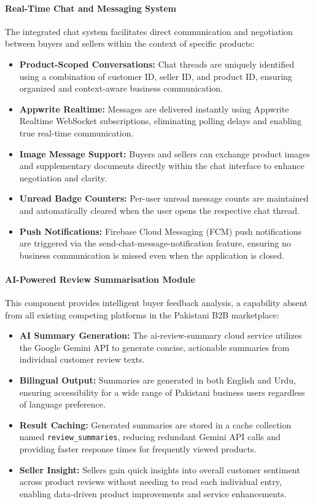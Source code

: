 \paragraph{Real-Time Chat and Messaging System}
The integrated chat system facilitates direct communication and negotiation between buyers and sellers within the context of specific products:
\begin{itemize}
    \item \textbf{Product-Scoped Conversations:} Chat threads are uniquely identified using a combination of customer ID, seller ID, and product ID, ensuring organized and context-aware business communication.
    \item \textbf{Appwrite Realtime:} Messages are delivered instantly using Appwrite Realtime WebSocket subscriptions, eliminating polling delays and enabling true real-time communication.
    \item \textbf{Image Message Support:} Buyers and sellers can exchange product images and supplementary documents directly within the chat interface to enhance negotiation and clarity.
    \item \textbf{Unread Badge Counters:} Per-user unread message counts are maintained and automatically cleared when the user opens the respective chat thread.
    \item \textbf{Push Notifications:} Firebase Cloud Messaging (FCM) push notifications are triggered via the send-chat-message-notification feature, ensuring no business communication is missed even when the application is closed.
\end{itemize}

\paragraph{AI-Powered Review Summarisation Module}
This component provides intelligent buyer feedback analysis, a capability absent from all existing competing platforms in the Pakistani B2B marketplace:
\begin{itemize}
   \item \textbf{AI Summary Generation:} The ai-review-summary cloud service utilizes the Google Gemini API to generate concise, actionable summaries from individual customer review texts.
   \item \textbf{Bilingual Output:} Summaries are generated in both English and Urdu, ensuring accessibility for a wide range of Pakistani business users regardless of language preference.
   \item \textbf{Result Caching:} Generated summaries are stored in a cache collection named \texttt{review\_summaries}, reducing redundant Gemini API calls and providing faster response times for frequently viewed products.
   \item \textbf{Seller Insight:} Sellers gain quick insights into overall customer sentiment across product reviews without needing to read each individual entry, enabling data-driven product improvements and service enhancements.
\end{itemize}

